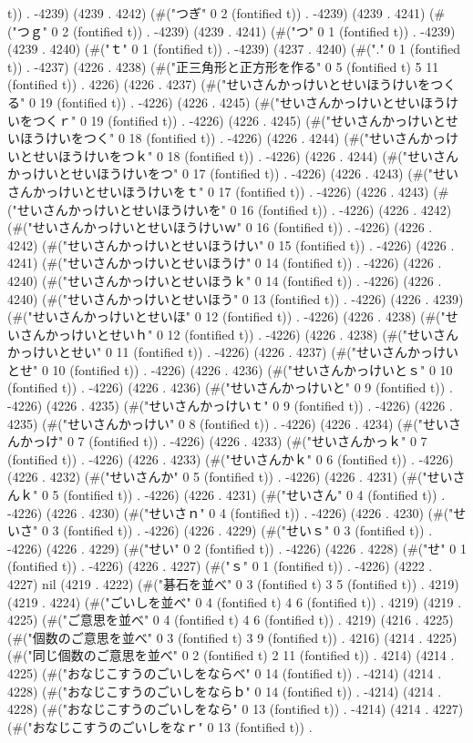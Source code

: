 t)) . -4239) (4239 . 4242) (#("つぎ" 0 2 (fontified t)) . -4239) (4239 . 4241) (#("つｇ" 0 2 (fontified t)) . -4239) (4239 . 4241) (#("つ" 0 1 (fontified t)) . -4239) (4239 . 4240) (#("ｔ" 0 1 (fontified t)) . -4239) (4237 . 4240) (#("." 0 1 (fontified t)) . -4237) (4226 . 4238) (#("正三角形と正方形を作る" 0 5 (fontified t) 5 11 (fontified t)) . 4226) (4226 . 4237) (#("せいさんかっけいとせいほうけいをつくる" 0 19 (fontified t)) . -4226) (4226 . 4245) (#("せいさんかっけいとせいほうけいをつくｒ" 0 19 (fontified t)) . -4226) (4226 . 4245) (#("せいさんかっけいとせいほうけいをつく" 0 18 (fontified t)) . -4226) (4226 . 4244) (#("せいさんかっけいとせいほうけいをつｋ" 0 18 (fontified t)) . -4226) (4226 . 4244) (#("せいさんかっけいとせいほうけいをつ" 0 17 (fontified t)) . -4226) (4226 . 4243) (#("せいさんかっけいとせいほうけいをｔ" 0 17 (fontified t)) . -4226) (4226 . 4243) (#("せいさんかっけいとせいほうけいを" 0 16 (fontified t)) . -4226) (4226 . 4242) (#("せいさんかっけいとせいほうけいｗ" 0 16 (fontified t)) . -4226) (4226 . 4242) (#("せいさんかっけいとせいほうけい" 0 15 (fontified t)) . -4226) (4226 . 4241) (#("せいさんかっけいとせいほうけ" 0 14 (fontified t)) . -4226) (4226 . 4240) (#("せいさんかっけいとせいほうｋ" 0 14 (fontified t)) . -4226) (4226 . 4240) (#("せいさんかっけいとせいほう" 0 13 (fontified t)) . -4226) (4226 . 4239) (#("せいさんかっけいとせいほ" 0 12 (fontified t)) . -4226) (4226 . 4238) (#("せいさんかっけいとせいｈ" 0 12 (fontified t)) . -4226) (4226 . 4238) (#("せいさんかっけいとせい" 0 11 (fontified t)) . -4226) (4226 . 4237) (#("せいさんかっけいとせ" 0 10 (fontified t)) . -4226) (4226 . 4236) (#("せいさんかっけいとｓ" 0 10 (fontified t)) . -4226) (4226 . 4236) (#("せいさんかっけいと" 0 9 (fontified t)) . -4226) (4226 . 4235) (#("せいさんかっけいｔ" 0 9 (fontified t)) . -4226) (4226 . 4235) (#("せいさんかっけい" 0 8 (fontified t)) . -4226) (4226 . 4234) (#("せいさんかっけ" 0 7 (fontified t)) . -4226) (4226 . 4233) (#("せいさんかっｋ" 0 7 (fontified t)) . -4226) (4226 . 4233) (#("せいさんかｋ" 0 6 (fontified t)) . -4226) (4226 . 4232) (#("せいさんか" 0 5 (fontified t)) . -4226) (4226 . 4231) (#("せいさんｋ" 0 5 (fontified t)) . -4226) (4226 . 4231) (#("せいさん" 0 4 (fontified t)) . -4226) (4226 . 4230) (#("せいさｎ" 0 4 (fontified t)) . -4226) (4226 . 4230) (#("せいさ" 0 3 (fontified t)) . -4226) (4226 . 4229) (#("せいｓ" 0 3 (fontified t)) . -4226) (4226 . 4229) (#("せい" 0 2 (fontified t)) . -4226) (4226 . 4228) (#("せ" 0 1 (fontified t)) . -4226) (4226 . 4227) (#("ｓ" 0 1 (fontified t)) . -4226) (4222 . 4227) nil (4219 . 4222) (#("碁石を並べ" 0 3 (fontified t) 3 5 (fontified t)) . 4219) (4219 . 4224) (#("ごいしを並べ" 0 4 (fontified t) 4 6 (fontified t)) . 4219) (4219 . 4225) (#("ご意思を並べ" 0 4 (fontified t) 4 6 (fontified t)) . 4219) (4216 . 4225) (#("個数のご意思を並べ" 0 3 (fontified t) 3 9 (fontified t)) . 4216) (4214 . 4225) (#("同じ個数のご意思を並べ" 0 2 (fontified t) 2 11 (fontified t)) . 4214) (4214 . 4225) (#("おなじこすうのごいしをならべ" 0 14 (fontified t)) . -4214) (4214 . 4228) (#("おなじこすうのごいしをならｂ" 0 14 (fontified t)) . -4214) (4214 . 4228) (#("おなじこすうのごいしをなら" 0 13 (fontified t)) . -4214) (4214 . 4227) (#("おなじこすうのごいしをなｒ" 0 13 (fontified t)) . 